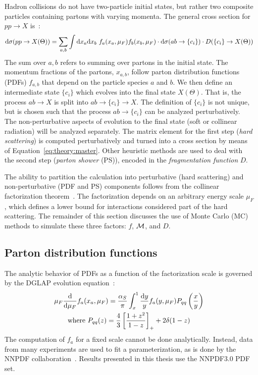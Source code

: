 Hadron collisions do not have two-particle initial states, but rather two composite particles containing partons with varying momenta. 
The general cross section for $pp\rightarrow X$ is~\cite{tasi009}:
\begin{equation}
\mathrm{d}\sigma(pp\rightarrow X(\Theta)) = 
    \sum_{a,b} \int \mathrm{d}x_a \mathrm{d}x_b 
    ~f_a(x_a,\mu_F) f_b(x_b,\mu_F) 
    \cdot \mathrm{d}\sigma(ab\rightarrow\{c_i\}) 
    \cdot D(\{c_i\}\rightarrow X(\Theta))
    \label{eq:theory:master}
\end{equation}
The sum over $a,b$ refers to summing over partons in the initial state.
The momentum fractions of the partons, $x_{a,b}$, follow parton distribution functions (PDFs) $f_{a,b}$ that depend on the particle species $a$ and $b$. 
We then define an intermediate state $\{c_i\}$ which evolves into the final state $X(\Theta)$.
That is, the process $ab\rightarrow X$ is split into $ab\rightarrow \{c_i\} \rightarrow X$.
The definition of $\{c_i\}$ is not unique, but is chosen such that the process $ab\rightarrow\{c_i\}$ can be analyzed perturbatively.
The non-perturbative aspects of evolution to the final state (soft or collinear radiation) will be analyzed separately. 
The matrix element for the first step (\emph{hard scattering}) is computed perturbatively and turned into a cross section by means of Equation~\ref{eq:theory:master}.
Other heuristic methods are used to deal with the second step (\emph{parton shower} (PS)), encoded in the \emph{fragmentation function} $D$. 

The ability to partition the calculation into perturbative (hard scattering) and non-perturbative (PDF and PS) components follows from the collinear factorization theorem~\cite{fact}.
The factorization depends on an arbitrary energy scale $\mu_F$, which defines a lower bound for interactions considered part of the hard scattering. 
The remainder of this section discusses the use of Monte Carlo (MC) methods to simulate these three factors: $f$, $\mathcal{M}$, and $D$.

\subsection{Parton distribution functions}
The analytic behavior of PDFs as a function of the factorization scale is governed by the DGLAP evolution equation~\cite{dglap1,dglap2,dglap3}:
\begin{gather}
    \mu_F \frac{\mathrm{d}}{\mathrm{d}\mu_F} f_a(x_a,\mu_F) = \frac{\alpha_S}{\pi} \int_x^1 \frac{\mathrm{d} y}{y} f_a(y,\mu_F) P_{qq} \left(\frac{x}{y}\right) \\
    \text{where } P_{qq}(z) = \frac{4}{3}\left[\frac{1+z^2}{1-z}\right]_+ + 2\delta(1-z) \nonumber 
    \label{eq:theory:dglap}
\end{gather}
The computation of $f_a$ for a fixed scale cannot be done analytically.
Instead, data from many experiments are used to fit a parameterization, as is done by the NNPDF collaboration~\cite{nnpdf}.
Results presented in this thesis use the NNPDF3.0 PDF set.


